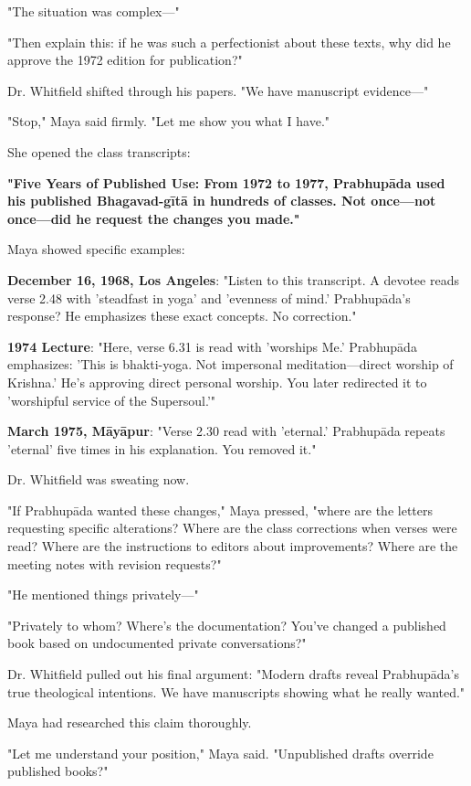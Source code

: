 \documentclass[12pt]{article}
\begin{document}
"The situation was complex—"

"Then explain this: if he was such a perfectionist about these texts, why did he approve the 1972 edition for publication?"

Dr. Whitfield shifted through his papers. "We have manuscript evidence—"

"Stop," Maya said firmly. "Let me show you what I have."

She opened the class transcripts:

\textbf{"Five Years of Published Use: From 1972 to 1977, Prabhupāda used his published Bhagavad-gītā in hundreds of classes. Not once—not once—did he request the changes you made."}

Maya showed specific examples:

\textbf{December 16, 1968, Los Angeles}: "Listen to this transcript. A devotee reads verse 2.48 with 'steadfast in yoga' and 'evenness of mind.' Prabhupāda's response? He emphasizes these exact concepts. No correction."

\textbf{1974 Lecture}: "Here, verse 6.31 is read with 'worships Me.' Prabhupāda emphasizes: 'This is bhakti-yoga. Not impersonal meditation—direct worship of Krishna.' He's approving direct personal worship. You later redirected it to 'worshipful service of the Supersoul.'"

\textbf{March 1975, Māyāpur}: "Verse 2.30 read with 'eternal.' Prabhupāda repeats 'eternal' five times in his explanation. You removed it."

Dr. Whitfield was sweating now.

"If Prabhupāda wanted these changes," Maya pressed, "where are the letters requesting specific alterations? Where are the class corrections when verses were read? Where are the instructions to editors about improvements? Where are the meeting notes with revision requests?"

"He mentioned things privately—"

"Privately to whom? Where's the documentation? You've changed a published book based on undocumented private conversations?"

Dr. Whitfield pulled out his final argument: "Modern drafts reveal Prabhupāda's true theological intentions. We have manuscripts showing what he really wanted."

Maya had researched this claim thoroughly.

"Let me understand your position," Maya said. "Unpublished drafts override published books?"
\end{document}
